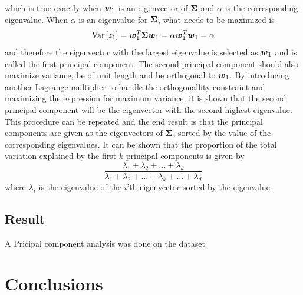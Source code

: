 which is true exactly when $\boldsymbol{w}_1$ is an eigenvector of $\boldsymbol{\Sigma}$ and $\alpha$ is the corresponding eigenvalue. When $\alpha$ is an eigenvalue for $\boldsymbol{\Sigma}$, what needs to be maximized is
\[
    \text{Var}\,[z_1] = \boldsymbol{w}_1^T\boldsymbol{\Sigma}\boldsymbol{w}_1 = \alpha\boldsymbol{w}_1^T\boldsymbol{w}_1 = \alpha
\]
and therefore the eigenvector with the largest eigenvalue is selected as $\boldsymbol{w}_1$ and is called the first principal component. The second principal component should also maximize variance, be of unit length and be orthogonal to $\boldsymbol{w}_1$. By introducing another Lagrange multiplier to handle the orthogonallity constraint and maximizing the expression for maximum variance, it is shown that the second principal component will be the eigenvector with the second highest eigenvalue. This procedure can be repeated and the end result is that the principal components are given as the eigenvectors of $\boldsymbol{\Sigma}$, sorted by the value of the corresponding eigenvalues. It can be shown that the proportion of the total variation explained by the first $k$ principal components is given by
\[
    \frac{\lambda_1+\lambda_2 +\dots + \lambda_k}{\lambda_1 + \lambda_2 + \dots + \lambda_k + \dots + \lambda_d}
\]
where $\lambda_i$ is the eigenvalue of the $i$'th eigenvector sorted by the eigenvalue.

\subsection{Result}
A Pricipal component analysis was done on the dataset

\section{Conclusions}

